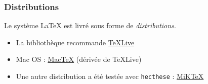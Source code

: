 \begin{frame}[c]

	\frametitle{Distributions}
	
	Le système {\LaTeX} est livré sous forme de \emph{distributions}.
	
	\begin{itemize}
		\item La bibliothèque recommande \href{https://www.tug.org/texlive}{\TeX Live}
		\item Mac OS : \href{https://www.tug.org/mactex}{Mac\TeX} (dérivée de \TeX Live)
		\item Une autre distribution a été testée avec \texttt{hecthese} :
			\href{https://miktex.org/download}{MiK\TeX}
	\end{itemize}
\end{frame}